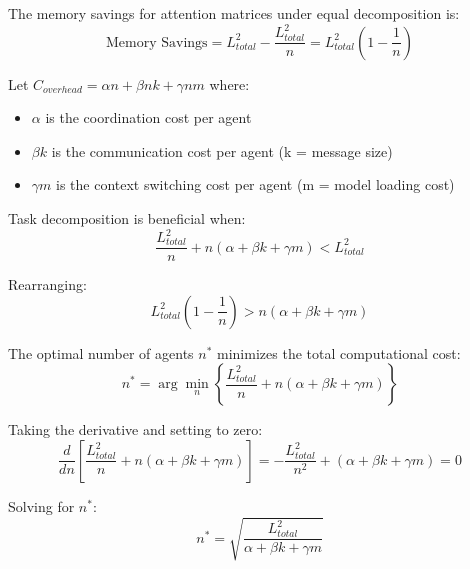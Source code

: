 \begin{theorem}
The memory savings for attention matrices under equal decomposition is:
\begin{equation}
\text{Memory Savings} = L_{total}^2 - \frac{L_{total}^2}{n} = L_{total}^2\left(1 - \frac{1}{n}\right)
\end{equation}
\end{theorem}

\begin{theorem}
Let $C_{overhead} = \alpha n + \beta n k + \gamma n m$ where:
\begin{itemize}
    \item $\alpha$ is the coordination cost per agent
    \item $\beta k$ is the communication cost per agent (k = message size)
    \item $\gamma m$ is the context switching cost per agent (m = model loading cost)
\end{itemize}

Task decomposition is beneficial when:
\begin{equation}
\frac{L_{total}^2}{n} + n(\alpha + \beta k + \gamma m) < L_{total}^2
\end{equation}

Rearranging:
\begin{equation}
L_{total}^2\left(1 - \frac{1}{n}\right) > n(\alpha + \beta k + \gamma m)
\end{equation}
\end{theorem}

\begin{corollary}
The optimal number of agents $n^*$ minimizes the total computational cost:
\begin{equation}
n^* = \arg\min_n \left\{\frac{L_{total}^2}{n} + n(\alpha + \beta k + \gamma m)\right\}
\end{equation}

Taking the derivative and setting to zero:
\begin{equation}
\frac{d}{dn}\left[\frac{L_{total}^2}{n} + n(\alpha + \beta k + \gamma m)\right] = -\frac{L_{total}^2}{n^2} + (\alpha + \beta k + \gamma m) = 0
\end{equation}

Solving for $n^*$:
\begin{equation}
n^* = \sqrt{\frac{L_{total}^2}{\alpha + \beta k + \gamma m}}
\end{equation}
\end{corollary}

